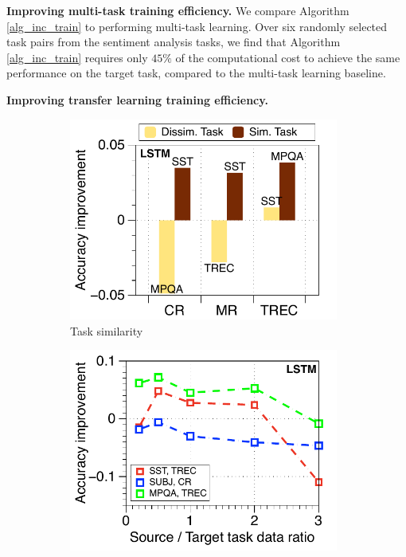 \textbf{Improving multi-task training efficiency.}
We compare Algorithm \ref{alg_inc_train} to performing multi-task learning.
Over six randomly selected task pairs from the sentiment analysis tasks, we find that Algorithm \ref{alg_inc_train} requires only $45\%$ of the computational cost to achieve the same performance on the target task, compared to the multi-task learning baseline.

\textbf{Improving transfer learning training efficiency.}
\todo{}

\begin{figure}[!t]
	\centering
	\begin{subfigure}[b]{0.33\textwidth}
		\centering
		\includegraphics[width=0.975\textwidth]{figures/task_sim_norm_lstm.pdf}
		\caption{Task similarity}
		\label{fig_ab_sim}
	\end{subfigure}%
	\begin{subfigure}[b]{0.33\textwidth}
		\centering
		\includegraphics[width=0.975\textwidth]{figures/ratio_norm_3_pairs_lstm.pdf}

\end{subfigure}
\end{figure}
